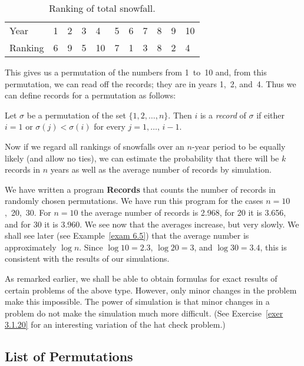 \begin{table}
\centering
\begin{tabular}{lllllllllll}  Year & 1 & 2 & 3 & 4 & 5 & 6 & 7 & 8 & 9 & 10 \\ 
	Ranking & 6 & 9 & 5 & 10 & 7 & 1 & 3 & 8 & 2 & 4
\end{tabular}
\caption{Ranking of total snowfall.}
\label{table 3.5}
\end{table}

This gives us a permutation of the numbers from 1~to~10 and, from this permutation, we
can read off the records; they are in years 1,~2, and~4.  Thus we can define records
for a permutation as follows:

\begin{definition}\label{def 3.3} Let $\sigma$ be a permutation of the set $\{1, 2, \ldots, n\}$.  
Then $i$ is a {\em record} of $\sigma$ if either $i = 1$ or $\sigma(j) < \sigma(i)$ for
every $j = 1,\ldots,\,i - 1$.
\end{definition}

Now if we regard all rankings of snowfalls over an $n$-year period to be equally
likely (and allow no ties), we can estimate the probability that there will be $k$
records in $n$ years as well as the average number of records by simulation.
\par
We have written a program {\bf Records} that
counts the number of records in randomly chosen permutations.  We have run this program 
for the cases $n = 10$,~20,~30. For $n = 10$ the average number of records is 2.968, 
for 20 it is 3.656, and for 30 it is 3.960. We see now that the averages increase, 
but very slowly.  We shall see later (see Example~\ref{exam 6.5}) that the average 
number is approximately $\log n$.  Since
$\log 10 = 2.3$,
$\log 20 = 3$, and
$\log 30 = 3.4$, this is consistent with the results of our simulations.
\par
As remarked earlier, we shall be able to obtain formulas for exact results of certain
problems of the above type.  However, only minor changes in the problem make this
impossible.  The power of simulation is that minor changes in a problem do not make
the simulation much more difficult.  (See Exercise~\ref{exer 3.1.20} for an interesting
variation of the hat check problem.)

\subsection*{List of Permutations}

